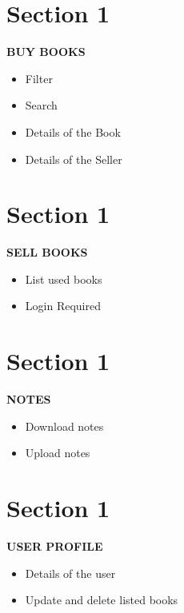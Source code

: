 \documentclass[10pt]{beamer} %
\begin{document}
\section{Section 1}
{\sectionheaderSkin %
\begin{frame}{\textbf{BUY BOOKS}}{
    
    \begin{itemize}
         \item Filter 
         \item Search
         \item Details of the Book
         \item Details of the Seller
    \end{itemize}
}
\end{frame}
}

\section{Section 1}
{\sectionheaderSkin %
\begin{frame}{\textbf{SELL BOOKS}}{
    
    \begin{itemize}
         \item List used books 
         \item Login Required
    \end{itemize}
}
\end{frame}
}

\section{Section 1}
{\sectionheaderSkin %
\begin{frame}{\textbf{NOTES}}{
    \begin{itemize}
         \item Download notes
         \item Upload notes
    \end{itemize}
}
\end{frame}
}

\section{Section 1}
{\sectionheaderSkin %
\begin{frame}{\textbf{USER PROFILE}}{
    \begin{itemize}
         \item Details of the user
         \item Update and delete listed books
    \end{itemize}
}
\end{frame}
}
\end{document}
